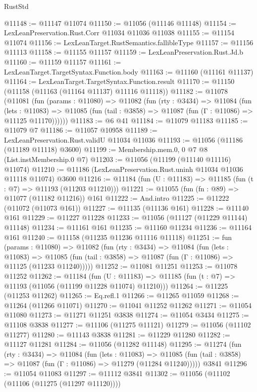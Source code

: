 \begin{lexlean}{RustStd}
\begin{coremodule}
@11148 := @11147 @11074
@11150 := @11056 (@11146 @11148)
@11154 := LexLeanPreservation.Rust.Corr @11034 @11036 @11038
@11155 := @11154 @11074
@11156 := LexLeanTarget.RustSemantics.fallibleType
@11157 := @11156 @11113
@11158 := @11155 @11157
@11159 := LexLeanPreservation.Rust.Jd.b
@11160 := @11159 @11157
@11161 := LexLeanTarget.TargetSyntax.Function.body
@11163 := @11160 (@11161 @11137)
@11164 := LexLeanTarget.TargetSyntax.Function.result
@11170 := @11150 (@11158 (@11163 (@11164 @11137) @11116 @11118))
@11182 := @11078
    (@11081
      (fun (params : @11080) =>
      @11082
        (fun (rty : @3434) =>
        @11084
          (fun (lets : @11083) =>
          @11085 (fun (tail : @3858) => @11087 (fun (Γ : @11086) => @11125 @11170))))))
@11183 := @6 @41
@11184 := @11079 @11183
@11185 := @11079 @7
@11186 := @11057 @10958
@11189 := LexLeanPreservation.Rust.validU @11034 @11036
@11193 := @11056 (@11186 (@11189 @11118) @3600)
@11199 := Membership.mem.{0, 0} @7 @8 (List.instMembership.{0} @7)
@11203 := @11056 (@11199 (@11140 @11116) @11074)
@11210 := @11186 (LexLeanPreservation.Rust.uninh @11034 @11036 @11118 @11074) @3600
@11216 := @11184 (fun (U : @11183) => @11185 (fun (t : @7) => @11193 (@11203 @11210)))
@11221 := @11055 (fun (fn : @89) => @11077 (@11182 @11216)) @161
@11222 := And.intro
@11225 := @11222 (@11072 (@11073 @161))
@11227 := @11135 (@11136 @161)
@11228 := @11140 @161
@11229 := @11227 @11228
@11233 := @11056 (@11127 (@11229 @11144) @11148)
@11234 := @11161 @161
@11235 := @11160 @11234
@11236 := @11164 @161
@11240 := @11158 (@11235 @11236 @11116 @11118)
@11251 := fun (params : @11080) =>
  @11082
    (fun (rty : @3434) =>
    @11084
      (fun (lets : @11083) =>
      @11085 (fun (tail : @3858) => @11087 (fun (Γ : @11086) => @11125 (@11233 @11240)))))
@11252 := @11081 @11251
@11253 := @11078 @11252
@11262 := @11184
    (fun (U : @11183) => @11185 (fun (t : @7) => @11193 (@11056 (@11199 @11228 @11074) @11210)))
@11264 := @11225 (@11253 @11262)
@11265 := Eq.refl.{1}
@11266 := @11265 @11059
@11268 := @11264 (@11266 @11071)
@11270 := @11041 @11252 @11262
@11271 := @11054 @11080
@11273 := @11271 @11251 @3838
@11274 := @11054 @3434
@11275 := @11108 @3838
@11277 := @11106 (@11275 @11121)
@11279 := @11056 (@11102 @11277)
@11280 := @11143 @3838
@11281 := @11229 @11280
@11282 := @11127 @11281
@11284 := @11056 (@11282 @11148)
@11295 := @11274
    (fun (rty : @3434) =>
    @11084
      (fun (lets : @11083) =>
      @11085 (fun (tail : @3858) => @11087 (fun (Γ : @11086) => @11279 (@11284 @11240)))))
    @3841
@11296 := @11054 @11083
@11297 := @11112 @3841
@11302 := @11056 (@11102 (@11106 (@11275 (@11297 @11120))))

\end{coremodule}
\end{lexlean}
